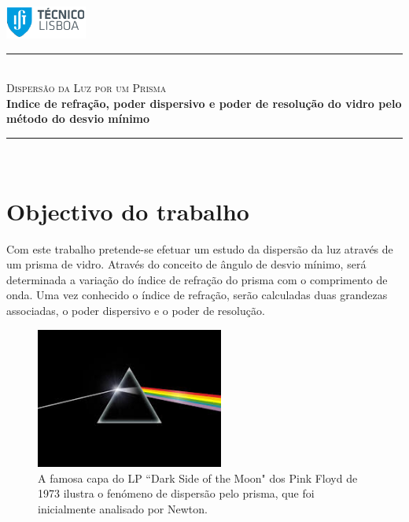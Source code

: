 \documentclass[a4paper,12pt]{article}  %
\author{Prof. Bernardo B. Carvalho}
\date{ Outubro 2012}
\newcommand{\HRule}{\rule{\linewidth}{0.5mm}}
\begin{document}
 

	\includegraphics[width=0.2\textwidth]{../../logo-ist}%

	\HRule \\[0.5cm]
	{ \huge \sf  \textsc{Dispersão da Luz por um Prisma}} \\[0.4cm] %
	{ \large \bfseries Indice de refração, poder dispersivo e poder de resolução do vidro pelo método do desvio mínimo}\\
	\HRule \\%

\section{\sf Objectivo do trabalho}
Com este trabalho pretende-se efetuar um estudo da dispersão da luz através de um prisma de vidro. Através do conceito de ângulo de desvio mínimo, será determinada a variação do índice de refração do prisma com o comprimento de onda. Uma vez conhecido o índice de refração, serão calculadas duas grandezas associadas, o poder dispersivo e o poder de resolução.

\begin{figure}[h!b]  \centering 
	\includegraphics[width=0.55\textwidth]{darkside}
	\caption{A famosa capa do LP ``Dark Side of the Moon" dos Pink Floyd de 1973 ilustra  o fenómeno de dispersão pelo prisma, que foi inicialmente  analisado por Newton.\label{fig:darkside}} 
\end{figure}
\end{document}
